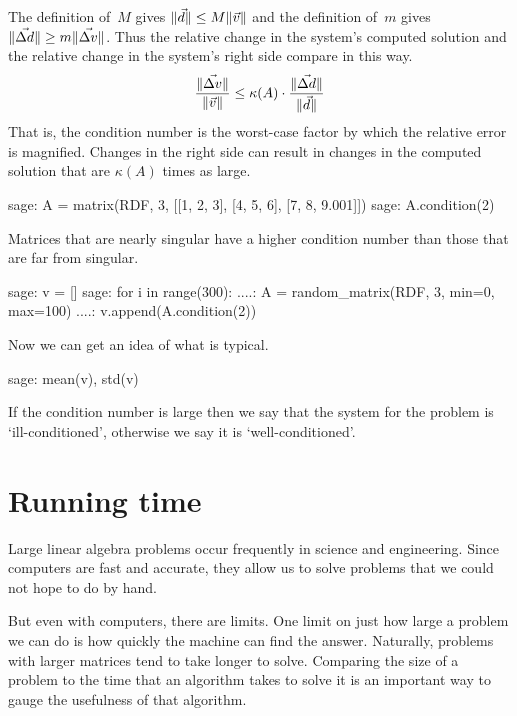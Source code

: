 The definition of~$M$ gives $\lVert\vec{d}\rVert\leq M\lVert\vec{v}\rVert$ and
the definition of~$m$ gives $\lVert\vec{\Delta d}\rVert\geq m\lVert\vec{\Delta v}\rVert$.
Thus the relative change in the 
system's computed solution
and the relative change in the system's right side
compare in this way. 
\begin{equation*}
  \frac{\lVert\vec{\Delta v}\rVert}{\lVert\vec{v}\rVert}
   \leq \kappa(A)\cdot \frac{\lVert\vec{\Delta d}\rVert}{\lVert\vec{d}\rVert}
\end{equation*}
That is, the condition number is the worst-case factor by which the
relative error is magnified. 
Changes in the right side can result in changes 
in the computed solution that are $\kappa(A)$ times as large.
\begin{sagecommandline}
sage: A = matrix(RDF, 3, [[1, 2, 3], [4, 5, 6], [7, 8, 9.001]])
sage: A.condition(2)
\end{sagecommandline}
Matrices that are nearly singular have a higher condition number than
those that are far from singular.
\begin{sagecommandline}
sage: v = []                                                                    
sage: for i in range(300): 
....:     A = random_matrix(RDF, 3, min=0, max=100) 
....:     v.append(A.condition(2))                                                                           
\end{sagecommandline}
Now we can get an idea of what is typical.
\begin{sagecommandline}
sage: mean(v), std(v)
\end{sagecommandline}
If the condition number is large then we say
that the system for the problem is `ill-conditioned',
otherwise we say it is `well-conditioned'.





\section{Running time}
Large linear algebra problems occur frequently in science and
engineering.
Since computers are fast and accurate,
they allow us to solve problems
that we could not hope to do by hand.

But even with computers, there are limits.
One limit on just how large a problem we can do is 
how quickly the machine can find the answer.
Naturally, problems with larger matrices tend to take longer to solve.
Comparing the size of a problem to the time that an algorithm takes to 
solve it is an important way to gauge the usefulness of 
that algorithm.

